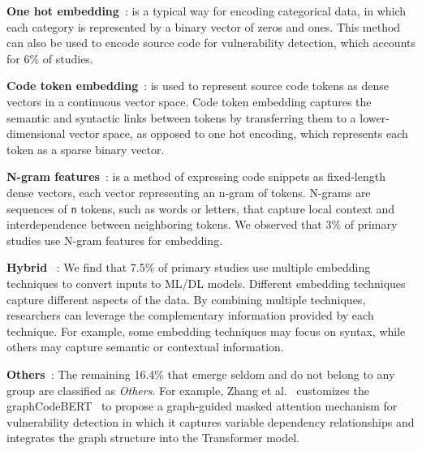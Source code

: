 \noindent \textbf{One hot embedding}~\cite{nguyen2020deep, hoang2019deepjit, 3327890, le2018maximal}: is a typical way for encoding categorical data, in which each category is represented by a binary vector of zeros and ones. This method can also be used to encode source code for vulnerability detection, which accounts for 6\% of studies.

\noindent \textbf{Code token embedding}~\cite{dam2018automatic, dam2017automatic, liu2020cd}: is used to represent source code tokens as dense vectors in a continuous vector space. Code token embedding captures the semantic and syntactic links between tokens by transferring them to a lower-dimensional vector space, as opposed to one hot encoding, which represents each token as a sparse binary vector.

\noindent \textbf{N-gram features}~\cite{shippey2019automatically, le2021deepcva}: is a method of expressing code snippets as fixed-length dense vectors, each vector representing an n-gram of tokens. N-grams are sequences of \verb|n| tokens, such as words or letters, that capture local context and interdependence between neighboring tokens. We observed that 3\% of primary studies use N-gram features for embedding.

\noindent \textbf{Hybrid} ~\cite{jeon2021autovas,
cheng2021deepwukong,
zhou2019devign,
3360588,
li2021vulnerability}: We find that 7.5\% of primary studies use multiple embedding techniques to convert inputs to ML/DL models. Different embedding techniques capture different aspects of the data. By combining multiple techniques, researchers can leverage the complementary information provided by each technique. For example, some embedding techniques may focus on syntax, while others may capture semantic or contextual information.

\noindent \textbf{Others}~\cite{sabetta2018practical,
kronjee2018discovering,
pascarella2019fine,
huang2021hunting,
ziems2021security,
filus2020random,
Vuldiggerpaper,
zhuang2022just,
cheng2022path,
zhang2022reentrancy,
ni2022best}: The remaining 16.4\% that emerge seldom and do not belong to any group are classified as \textit{Others}. For example, Zhang et al.~\cite{zhang2022reentrancy} customizes the graphCodeBERT~\cite{guo2020graphcodebert} to propose a graph-guided masked attention mechanism for vulnerability detection in which it captures variable dependency relationships and integrates the graph structure into the Transformer model.

